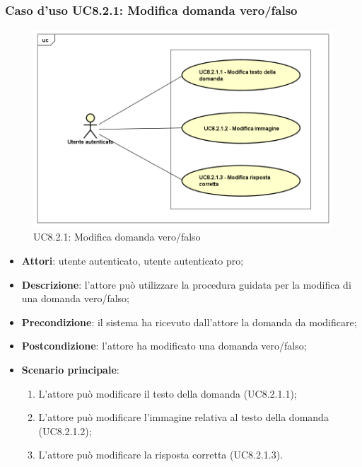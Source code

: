\subsubsection{Caso d'uso UC8.2.1: Modifica domanda vero/falso}
	\label{UC8.2.1}
	\begin{figure}[h]
		\centering
			\includegraphics[scale=0.45,keepaspectratio]{UML/UC8_2_1.png}
		\caption{UC8.2.1: Modifica domanda vero/falso}
	\end{figure}
	\FloatBarrier
	\begin{itemize}
		\item
			\textbf{Attori}: utente autenticato, utente autenticato pro;
		\item		
			\textbf{Descrizione}: l'attore può utilizzare la procedura guidata per la modifica di una domanda vero/falso;
		\item
			\textbf{Precondizione}: il sistema ha ricevuto dall'attore la domanda da modificare;  
		\item
			\textbf{Postcondizione}: l'attore ha modificato una domanda vero/falso;
		\item
			\textbf{Scenario principale}:
	       		\begin{enumerate}
	       			\item
	       			L'attore può modificare il testo della domanda (UC8.2.1.1);
	       			\item
	       			L'attore può modificare l'immagine relativa al testo della domanda (UC8.2.1.2);
					\item
					L'attore può modificare la risposta corretta (UC8.2.1.3).
	 			\end{enumerate}
	\end{itemize}
	
